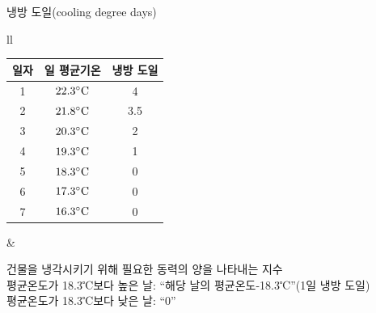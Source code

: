 \begin{frame}[t]{냉방 도일(cooling degree days)}
	\begin{tabular}{ll}
		\begin{minipage}[t]{0.50\textwidth}
			{\scriptsize
				\begin{table}[]
					\begin{tabular}{c|c|c}
						\hline
						일자 & 일 평균기온  & 냉방 도일 \\						\hline
						1  & $22.3 \rm{{^\circ}C}$ & 4    \\						\hline
						2  & $21.8 \rm{{^\circ}C}$ & 3.5  \\						\hline
						3  & $20.3 \rm{{^\circ}C}$ & 2    \\						\hline
						4  & $19.3 \rm{{^\circ}C}$ & 1    \\						\hline
						5  & $18.3 \rm{{^\circ}C}$ & 0    \\						\hline
						6  & $17.3 \rm{{^\circ}C}$ & 0    \\						\hline
						7  & $16.3 \rm{{^\circ}C}$ & 0   \\						\hline
					\end{tabular}%
			\end{table}
			}
		\end{minipage}	
		&
		\begin{minipage}[t]{0.45\textwidth}
			건물을 냉각시키기 위해 필요한 동력의 양을 나타내는 지수\\
			평균온도가 18.3℃보다 높은 날: “해당 날의 평균온도-18.3℃”(1일 냉방 도일)\\
			평균온도가 18.3℃보다 낮은 날: “0”
			
		\end{minipage}
	\end{tabular}
\end{frame}



